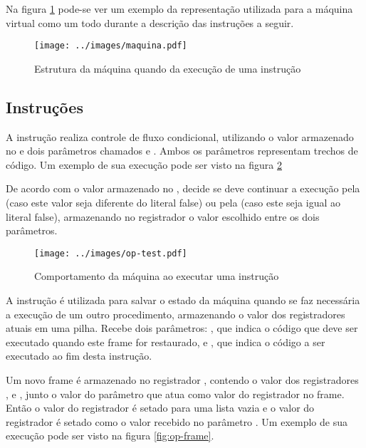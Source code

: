Na figura \ref{fig:maquina} pode-se ver um exemplo da representação utilizada
para a máquina virtual como um todo durante a descrição das instruções a
seguir.

\begin{figure}[h!]
\centering
\texttt{[image: ../images/maquina.pdf]}
\caption{Estrutura da máquina quando da execução de uma instrução }
\label{fig:maquina}
\end{figure}


\subsection{Instruções}
\label{ss:instrucoes}

A instrução  realiza controle de fluxo condicional, utilizando o
valor armazenado no  e dois parâmetros chamados
 e . Ambos os parâmetros representam
trechos de código. Um exemplo de sua execução pode ser visto na figura
\ref{fig:op-test}

De acordo com o valor armazenado no , decide se deve continuar
a execução pela  (caso este valor seja diferente do literal
false) ou pela  (caso este seja igual ao literal false),
armazenando no registrador  o valor escolhido entre os dois
parâmetros.

\begin{figure}[h!]
\centering
\texttt{[image: ../images/op-test.pdf]}
\caption{Comportamento da máquina ao executar uma instrução }
\label{fig:op-test}
\end{figure}

A instrução  é utilizada para salvar o estado da
máquina quando se faz necessária a execução de um outro procedimento,
armazenando o valor dos registradores atuais em uma pilha. Recebe dois
parâmetros: , que indica o código que deve ser executado quando
este frame for restaurado, e , que indica o código a ser
executado ao fim desta instrução.

Um novo frame é armazenado no registrador , contendo o valor dos
registradores ,  e , junto o valor do
parâmetro  que atua como valor do registrador  no
frame. Então o valor do registrador  é setado para uma lista vazia
e o valor do registrador  é setado como o valor recebido no
parâmetro . Um exemplo de sua execução pode ser visto na figura
\ref{fig:op-frame}.

